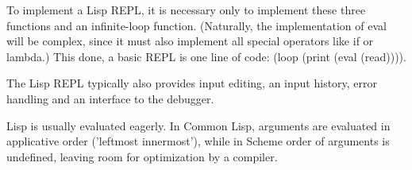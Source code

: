 \documentclass[a4paper]{book}
\begin{document}
To implement a Lisp REPL, it is necessary only to implement these three functions and an infinite-loop function. (Naturally, the implementation of eval will be complex, since it must also implement all special operators like if or lambda.) This done, a basic REPL is one line of code: (loop (print (eval (read)))).

The Lisp REPL typically also provides input editing, an input history, error handling and an interface to the debugger.

Lisp is usually evaluated eagerly. In Common Lisp, arguments are evaluated in applicative order ('leftmost innermost'), while in Scheme order of arguments is undefined, leaving room for optimization by a compiler.
\end{document}
